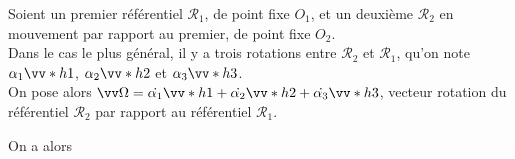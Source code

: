 \documentclass[a4paper]{article}
\begin{document}
\pagestyle{fancy}
\fancyhf{}
\setlength{\headheight}{15pt}

\begin{center}
	\large{}
\end{center}


Soient un premier référentiel \( \mathcal{R}_1 \), de point fixe \( O_1 \), et un deuxième \( \mathcal{R}_2 \) en mouvement par rapport au premier, de point fixe \( O_2 \). \\
Dans le cas le plus général, il y a trois rotations entre \( \mathcal{R}_2 \) et \( \mathcal{R}_1 \), qu'on note \( \alpha_1\vv*h1 \), \( \alpha_2\vv*h2 \) et \( \alpha_3\vv*h3 \). \\
On pose alors \( \vv\Omega = \dot{\alpha_1}\vv*h1 + \dot{\alpha_2}\vv*h2 + \dot{\alpha_3}\vv*h3 \), vecteur rotation du référentiel \( \mathcal{R}_2 \) par rapport au référentiel \( \mathcal{R}_1 \).

On a alors
\begin{center}
\end{center}
\end{document}
